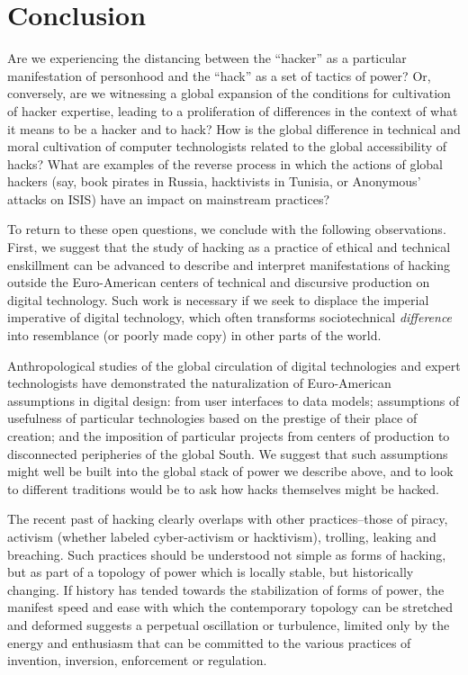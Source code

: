 \documentclass[10pt,letter,oneside]{scrartcl}
\begin{document}
\section*{Conclusion}

Are we experiencing the distancing between the ``hacker'' as a particular
manifestation of personhood and the ``hack'' as a set of tactics of power? Or,
conversely, are we witnessing a global expansion of the conditions for
cultivation of hacker expertise, leading to a proliferation of differences in
the context of what it means to be a hacker and to hack? How is the global
difference in technical and moral cultivation of computer technologists related
to the global accessibility of hacks?  What are examples of the reverse process
in which the actions of global hackers (say, book pirates in Russia, hacktivists
in Tunisia, or Anonymous' attacks on ISIS) have an impact on mainstream
practices?

To return to these open questions, we conclude with the following observations.
First, we suggest that the study of hacking as a practice of ethical and
technical enskillment can be advanced to describe and interpret manifestations
of hacking outside the Euro-American centers of technical and discursive
production on digital technology.  Such work is necessary if we seek to displace the
imperial imperative of digital technology, which often transforms sociotechnical
\emph{difference} into resemblance (or poorly made copy) in other parts of the
world.

Anthropological studies of the global circulation of digital technologies and
expert technologists have demonstrated the naturalization of Euro-American
assumptions in digital design: from user interfaces to data models; assumptions
of usefulness of particular technologies based on the prestige of their place of
creation; and the imposition of particular projects from centers of production
to disconnected peripheries of the global
South\autocite{chan_networking_2013,takhteyev_coding_2012,xiang_2007,murillo2015}.
We suggest that such assumptions might well be built into the global stack of
power we describe above, and to look to different traditions would be to ask how
hacks themselves might be hacked.

The recent past of hacking clearly overlaps with other practices--those of 
piracy, activism (whether labeled cyber-activism or hacktivism), trolling, 
leaking and breaching.  Such practices should be understood not simple as 
forms of hacking, but as part of a topology of power which is locally stable, 
but historically changing.  If history has tended towards the stabilization of forms 
of power, the manifest speed and ease with which the contemporary topology 
can be stretched and deformed suggests a perpetual oscillation or turbulence, 
limited only by the energy and enthusiasm that can be committed to the various 
practices of invention, inversion, enforcement or regulation.
\end{document}
